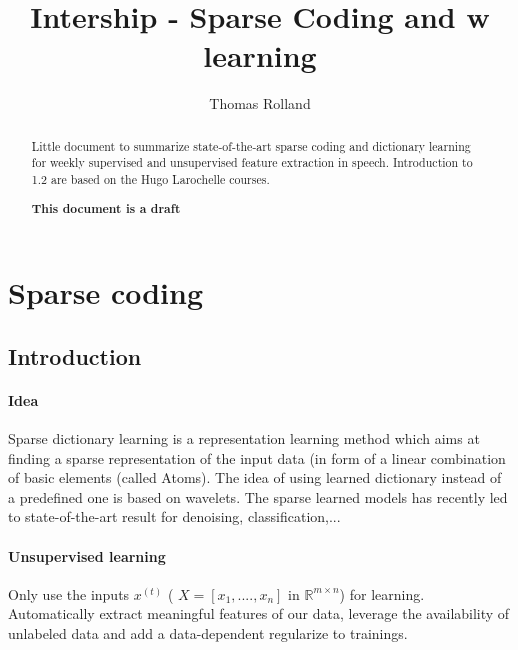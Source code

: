 \documentclass[a4paper,10pt]{article}
\title{Intership - Sparse Coding and w learning}
\author{Thomas Rolland}
\date{}%
\newcommand{\R}{\mathbb{R}}
\begin{document}
\maketitle

\begin{abstract}
Little document to summarize state-of-the-art sparse coding and dictionary learning for weekly supervised  and unsupervised  feature extraction in speech. Introduction to 1.2 are  based on the Hugo Larochelle courses.\\
\begin{center}

\textbf{This document is a draft }
 
\end{center}
\end{abstract}
\tableofcontents
\section{Sparse coding}
\subsection{Introduction}
\paragraph{Idea} Sparse dictionary learning is a representation learning method which aims at finding a sparse representation of the input data (in form of a linear combination of basic elements (called Atoms). The idea of using learned dictionary instead of a predefined one is based on wavelets. The sparse learned models has recently led to state-of-the-art result for denoising, classification,...
\paragraph{Unsupervised learning} Only use the inputs $x^{(t)}$ ( $X = [x_1,....,x_n]$ in $\R^{m \times n}$) for learning. Automatically extract meaningful features of our data, leverage the availability of unlabeled data and add a data-dependent regularize to trainings.\\
\end{document}
